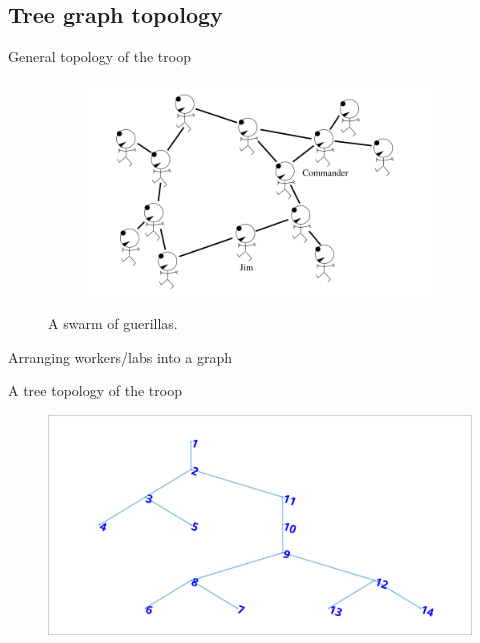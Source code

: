 \documentclass[pdflatex,colorlinks,landscape]{beamer}
\begin{document}
\subsection{Tree graph topology}

\begin{frame}{General topology of the troop}
  \begin{figure}[H]
    \begin{figure}
      \includegraphics[width=\textwidth]{SwarmOfGuerillas.png}
    \end{figure}
    \caption{A swarm of guerillas.}
  \end{figure}
\end{frame}

\begin{frame}[allowframebreaks]{Arranging workers/labs into a graph}
  \begin{small}
    
  \end{small}
\end{frame}  

\begin{frame}{A tree topology of the troop}
  \begin{figure}
    \includegraphics[width=\textwidth]{TroopTopology.png}
  \end{figure}
\end{frame}
\end{document}
